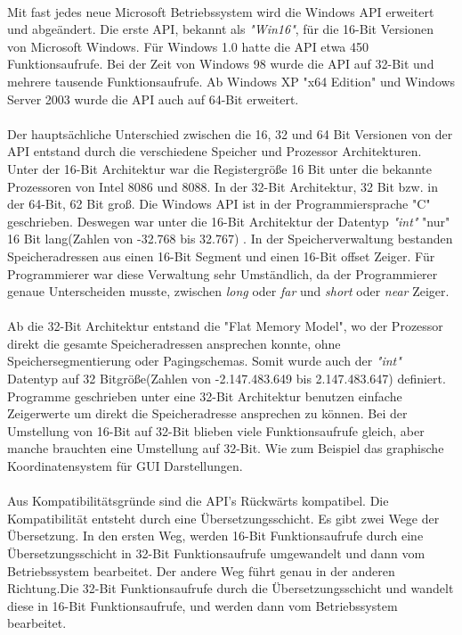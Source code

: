 \paragraph{}
Mit fast jedes neue Microsoft Betriebssystem wird die Windows API erweitert und abgeändert. Die erste API, bekannt als \textit{"Win16"}, für die 16-Bit Versionen von Microsoft Windows. Für Windows 1.0 hatte die API etwa 450 Funktionsaufrufe. Bei der Zeit von Windows 98 wurde die API auf 32-Bit und mehrere tausende Funktionsaufrufe. Ab Windows XP "x64 Edition" und Windows Server 2003 wurde die API auch auf 64-Bit erweitert.
\paragraph{}
Der hauptsächliche Unterschied zwischen die 16, 32 und 64 Bit Versionen von der API entstand durch die verschiedene Speicher und Prozessor Architekturen. Unter der 16-Bit Architektur war die Registergröße 16 Bit unter die bekannte Prozessoren von Intel 8086 und 8088. In der 32-Bit Architektur, 32 Bit bzw. in der 64-Bit, 62 Bit groß. Die Windows API ist in der Programmiersprache "C" geschrieben. Deswegen war unter die 16-Bit Architektur der Datentyp \textit{"int"} "nur" 16 Bit lang(Zahlen von -32.768 bis 32.767) . In der Speicherverwaltung bestanden Speicheradressen aus einen 16-Bit Segment und einen 16-Bit offset Zeiger. Für Programmierer war diese Verwaltung sehr Umständlich, da der Programmierer genaue Unterscheiden musste, zwischen \textit{long} oder \textit{far} und \textit{short} oder \textit{near} Zeiger. 
\paragraph{}
Ab die 32-Bit Architektur entstand die "Flat Memory Model", wo der Prozessor direkt die gesamte Speicheradressen ansprechen konnte, ohne Speichersegmentierung oder Pagingschemas. Somit wurde auch der \textit{"int"} Datentyp auf 32 Bitgröße(Zahlen von -2.147.483.649 bis 2.147.483.647) definiert. Programme geschrieben unter eine 32-Bit Architektur benutzen einfache Zeigerwerte um direkt die Speicheradresse ansprechen zu können. Bei der Umstellung von 16-Bit auf 32-Bit blieben viele Funktionsaufrufe gleich, aber manche brauchten eine Umstellung auf 32-Bit. Wie zum Beispiel das graphische Koordinatensystem für GUI Darstellungen.
\paragraph{}
 Aus Kompatibilitätsgründe sind die API's Rückwärts kompatibel. Die Kompatibilität entsteht durch eine Übersetzungsschicht. Es gibt zwei Wege der Übersetzung. In den ersten Weg, werden 16-Bit Funktionsaufrufe durch eine Übersetzungsschicht in 32-Bit Funktionsaufrufe umgewandelt und dann vom Betriebssystem bearbeitet. Der andere Weg führt genau in der anderen Richtung.Die 32-Bit Funktionsaufrufe durch die Übersetzungsschicht und wandelt diese in 16-Bit Funktionsaufrufe, und werden dann vom Betriebssystem bearbeitet.
